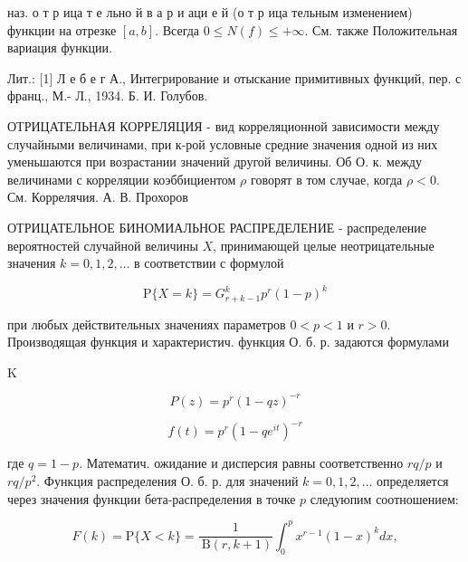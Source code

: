 \documentclass[10pt]{article}
\begin{document}
наз. о т р ица т е льно й в а р и аци е й (о т р ица тельным изменением) функции на отрезке $[a, b]$. Всегда $0 \leqslant N(f) \leqslant+\infty$. См. также Положительная вариация функции.



Лит.: [1] Л е б е г А., Интегрирование и отыскание примитивных функций, пер. с франц., М.- Л., 1934. Б. И. Голубов.



ОТРИЦАТЕЛЬНАЯ КОРРЕЛЯЦИЯ - вид корреляционной зависимости между случайными величинами, при к-рой условные средние значения одной из них уменьшаются при возрастании значений другой величины. Об О. к. между величинами с корреляции коэббициентом $\rho$ говорят в том случае, когда $\rho<0$. См. Коррелячия. А. В. Прохоров



ОТРИЦАТЕЛЬНОЕ БИНОМИАЛЬНОЕ РАСПРЕДЕЛЕНИЕ - распределение вероятностей случайной величины $X$, принимающей целые неотрицательные значения $k=0,1,2, \ldots$ в соответствии с формулой



\[

\mathrm{P}\{X=k\}=G_{r+k-1}^{k} p^{r}(1-p)^{k}

\]



при любых действительных значениях параметров $0<p<1$ и $r>0$. Производящая функция и характеристич. функция О. б. р. задаются формулами



K



\[

P(z)=p^{r}(1-q z)^{-r}

\]



\[

f(t)=p^{r}\left(1-q e^{i t}\right)^{-r}

\]



где $q=1-p$. Математич. ожидание и дисперсия равны соответственно $r q / p$ и $r q / p^{2}$. Функция распределения О. б. р. для значений $k=0,1,2, \ldots$ определяется через значения функции бета-распределения в точке $p$ следуюпим соотношением:



\[

F(k)=\mathrm{P}\{X<k\}=\frac{1}{\mathrm{~B}(r, k+1)} \int_{0}^{p} x^{r-1}(1-x)^{k} d x,

\]
\end{document}
